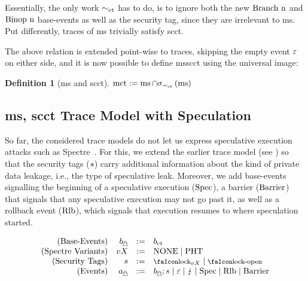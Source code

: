 \documentclass[dvipsnames,conference]{IEEEtran}
\theoremstyle{definition}
\newtheorem{definition}{Definition}[section]
\begin{document}
Essentially, the only work $\sim_{\operatorname{ct}}$ has to do, is to ignore both the new $\text{Branch\ n}$ and $\text{Binop\ n}$ base-events as well as the security tag, since they are irrelevant to \gls*{ms}.
Put differently, traces of \gls*{ms} trivially satisfy \gls*{scct}.

The above relation is extended point-wise to traces, skipping the empty event $\varepsilon$ on either side, and it is now possible to define \gls*{msscct} using the universal image:

\begin{definition}[\gls*{ms} and \gls*{scct}]\label{def:trace:msscctdef}
  $
  \operatorname{mct}:=\operatorname{ms}\cap\sigma_{\sim_{\operatorname{ct}}}\left(\operatorname{ms}\right)
  $
\end{definition}

\subsection{\gls*{ms}, \gls*{scct} Trace Model with Speculation}\label{subsec:msctss:tracemodel}

So far, the considered trace models do not let us express speculative execution attacks such as Spectre~\cite{kocher2019spectre}. 
For this, we extend the earlier trace model (see ) so that the security tags ($s{}$) carry additional information about the kind of private data leakage, i.e., the type of speculative leak.
Moreover, we add base-events signalling the beginning of a speculative execution ($\text{Spec}$), a barrier ($\text{Barrier}$) that signals that any speculative execution may not go past it, as well as a rollback event ($\text{Rlb}$), which signals that execution resumes to where speculation started.

\vspace{-1em}
{
\[
  \begin{array}{rrcl}
    (\text{Base-Events}) & \preevent[_{\mathghost}] &:=& \preevent[_{\ctsafe}] \\
    (\text{Spectre Variants}) & vX &:=& \operatorname{NONE} \mid \operatorname{PHT} \\
    (\text{Security Tags}) & \securitytag{} &:=& \lock_{vX} \mid \unlock\\ 
    (\text{Events}) & \event[_{\mathghost}] &:=& \preevent[_{\mathghost}];\securitytag{} \mid \emptyevent \mid \lightning \mid \ev{Spec} \mid \ev{Rlb} \mid \ev{Barrier}\\ 
  \end{array}
\]
}
\end{document}

